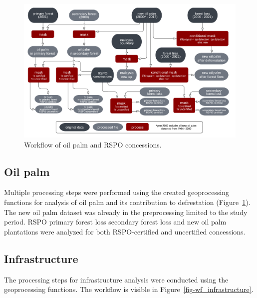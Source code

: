 \documentclass[
  letterpaper,
  DIV=11,
  numbers=noendperiod]{scrreprt}
\begin{document}
\begin{figure}[H]

{\centering \includegraphics{text/05_method_files/op_workflow.png}

}

\caption{\label{fig-wf_oilpalm}Workflow of oil palm and RSPO
concessions.}

\end{figure}

\newpage

\hypertarget{oil-palm}{%
\subsection{Oil palm}\label{oil-palm}}

Multiple processing steps were performed using the created geoprocessing
functions for analysis of oil palm and its contribution to defrestation
(Figure~\ref{fig-wf_oilpalm}). The new oil palm dataset was already in
the preprocessing limited to the study period. RSPO primary forest loss
secondary forest loss and new oil palm plantations were analyzed for
both RSPO-certified and uncertified concessions.

\hypertarget{infrastructure}{%
\subsection{Infrastructure}\label{infrastructure}}

The processing steps for infrastructure analysis were conducted using
the geoprocessing functions. The workflow is visible in
Figure~\ref{fig-wf_infrastructure}.
\end{document}
